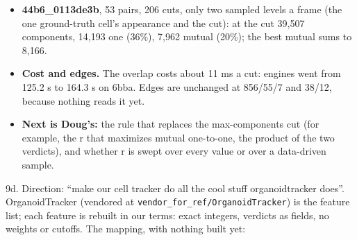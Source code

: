 \begin{itemize}
\begin{itemize}
\item at the earlier frame's cut: 61,679 components, 15,979 overlap exactly one (26\%), and \textbf{6,688 mutual (11\%)};
\item the best mutual over each pair's sampled cuts sums to \textbf{13,783} (139 a pair, against 68 at the cut);
\item frame 0→1 at level 1,045,988: 204 components, 167 one, \textbf{144 mutual}. At the cut, level 84,314: 329 components, 83 one, 29 mutual;
\item the mutual count peaks high in the tree (codes about 1.0 to 1.1M of about 1.1M), at 150 to 200 components a frame, where 70–80\% of the components are mutual. The max-components cut sits low, where 10–30\% are.
\end{itemize}
\item \textbf{44b6\_\allowbreak{}0113de3b}, 53 pairs, 206 cuts, only two sampled levels a frame (the one ground-truth cell's appearance and the cut): at the cut 39,507 components, 14,193 one (36\%), 7,962 mutual (20\%); the best mutual sums to 8,166.
\item \textbf{Cost and edges.} The overlap costs about 11 ms a cut: engines went from 125.2 s to 164.3 s on 6bba. Edges are unchanged at 856/55/7 and 38/12, because nothing reads it yet.
\item \textbf{Next is Doug's:} the rule that replaces the max-components cut (for example, the r that maximizes mutual one-to-one, the product of the two verdicts), and whether r is swept over every value or over a data-driven sample.
\end{itemize}

9d. Direction: “make our cell tracker do all the cool stuff organoidtracker does”. OrganoidTracker (vendored at \texttt{vendor\_\allowbreak{}for\_\allowbreak{}ref/\allowbreak{}Organoid\allowbreak{}Tracker}) is the feature list; each feature is rebuilt in our terms: exact integers, verdicts as fields, no weights or cutoffs. The mapping, with nothing built yet:

